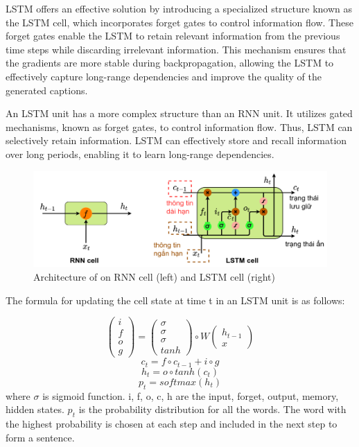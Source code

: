 \documentclass[conference]{IEEEtran}
\begin{document}
LSTM offers an effective solution by introducing a specialized structure known as the LSTM cell, which incorporates forget gates to control information flow. These forget gates enable the LSTM to retain relevant information from the previous time steps while discarding irrelevant information. This mechanism ensures that the gradients are more stable during backpropagation, allowing the LSTM to effectively capture long-range dependencies and improve the quality of the generated captions.


An LSTM unit has a more complex structure than an RNN unit. It utilizes gated mechanisms, known as forget gates, to control information flow. Thus, LSTM can selectively retain information. LSTM can effectively store and recall information over long periods, enabling it to learn long-range dependencies.


\begin{figure}[h]
\includegraphics[width=\columnwidth]{assets/RNN_LSTM_compare.png}
  \caption{Architecture of on RNN cell (left) and LSTM cell (right)}
  \label{fig:RNN_LSTM_compare}
\end{figure}


The formula for updating the cell state at time t in an LSTM unit is as follows:

$$
\begin{pmatrix}
i \\f \\o \\g
\end{pmatrix}
= 
\begin{pmatrix}
\sigma \\ \sigma \\ \sigma \\ tanh
\end{pmatrix}
\circ
W
\begin{pmatrix}
h_{t-1} \\
x
\end{pmatrix}
$$
$$
c_t = f\circ c_{t-1} + i\circ g
$$
$$
h_t = o \circ tanh(c_t)
$$
$$
p_t = softmax(h_t)
$$
where $\sigma$ is sigmoid function. i, f, o, c, h are the input, forget, output, memory, hidden states. $p_t$ is the probability distribution for all the words. The word with the highest probability is chosen at each step and included in the next step to form a sentence.
\end{document}

